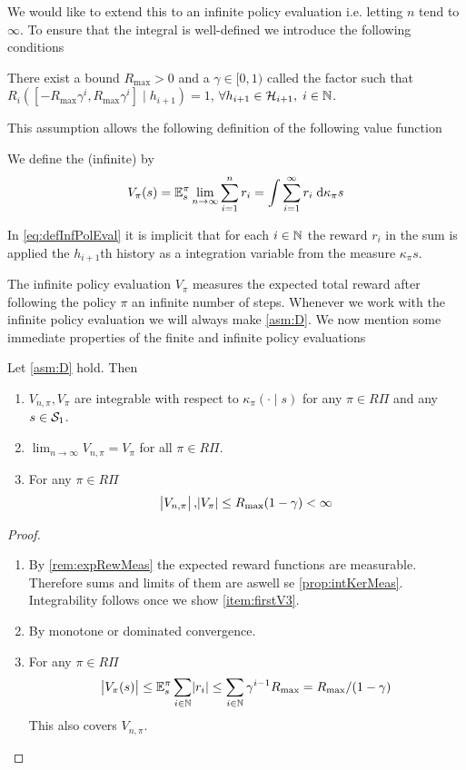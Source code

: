 We would like to extend this to an infinite policy evaluation
i.e. letting $n$ tend to $\infty$. To ensure that the integral is well-defined
we introduce the following conditions
\begin{asm}[Discounting] There exist a bound $R_{\max} > 0$ and a
  $\gamma \in [0,1)$ called the  factor such that
  $R_i([-R_{\max} \gamma^i, R_{\max} \gamma^i] \mid h_{i+1}) = 1$,
  $\forall h_{i+1} \in \mathcal{H}_{i+1},\; i \in \mathbb{N}$.
  \label{asm:D}
\end{asm}
This assumption allows the following definition of the following value function
\begin{defn}
  We define the (infinite)  by
  \begin{equation}
    V_\pi(s) = \mathbb{E}_s^\pi \lim_{n \to \infty} \sum_{i=1}^n r_i
    = \int \sum_{i=1}^\infty r_i \; \mathrm{d} \kappa_\pi s
    \label{eq:defInfPolEval}
  \end{equation}
\end{defn}
\begin{rem}
  In \cref{eq:defInfPolEval}
  it is implicit that for each $i \in \mathbb{N}$ the reward
  $r_i$ in the sum is applied 
  the $h_{i+1}$th history as a integration variable
  from the measure $\kappa_\pi s$.
\end{rem}
The infinite policy evaluation $V_\pi$ measures the expected total
reward after following the policy $\pi$ an infinite number of steps.
Whenever we work with the infinite policy evaluation we will
always make \cref{asm:D}.
We now mention some immediate properties of the finite and infinite
policy evaluations
\begin{prop} Let \cref{asm:D} hold. Then
  \leavevmode
  \begin{enumerate}
    \item $V_{n,\pi}, V_\pi$ are integrable with respect to
      $\kappa_\pi(\cdot \mid s)$
      for any $\pi \in R\Pi$ and any $s \in \mathcal{S}_1$.
    \item $\lim_{n\to\infty} V_{n, \pi} = V_\pi$
      for all $\pi \in R\Pi$.
    \item For any $\pi \in R\Pi$
      \[\abs{V_{n,\pi}}, \abs{V_\pi} \leq R_{\max} (1 - \gamma) < \infty\]
      \label{item:firstV3}
  \end{enumerate}
  \label{prop:VpiMeas}
\end{prop}
\begin{proof}  
  \leavevmode
  \begin{enumerate}
    \item By \cref{rem:expRewMeas} the expected reward functions
      are measurable. Therefore sums and limits of them are aswell
      se \cref{prop:intKerMeas}.
      Integrability follows once we show \cref{item:firstV3}.
    \item By monotone or dominated convergence.
    \item For any $\pi \in R\Pi$
      \[ \abs{V_\pi(s)} \leq \mathbb{E}_s^\pi \sum_{i \in \mathbb{N}} \abs{r_i}
	\leq \sum_{i \in \mathbb{N}} \gamma^{i-1} R_{\max}
      = R_{\max} / (1-\gamma) \]
      This also covers $V_{n, \pi}$.
  \end{enumerate}
\end{proof}

